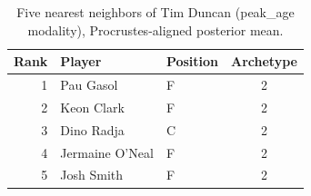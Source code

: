 \begin{table}[htbp]
  \centering\small
  \begin{tabular}{rllc}
    \toprule
    Rank & Player & Position & Archetype \\
    \midrule
    1 & Pau Gasol & F & 2 \\
    2 & Keon Clark & F & 2 \\
    3 & Dino Radja & C & 2 \\
    4 & Jermaine O'Neal & F & 2 \\
    5 & Josh Smith & F & 2 \\
    \bottomrule
  \end{tabular}
  \caption{Five nearest neighbors of Tim Duncan (peak_age modality), Procrustes-aligned posterior mean.}
  \label{tab:Tim_Duncan_neighbors_peak_age}
\end{table}

